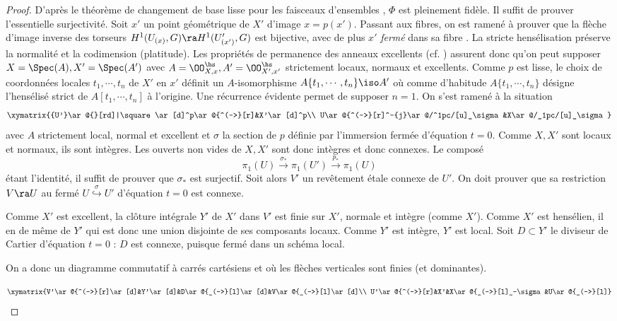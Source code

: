 \documentclass[10pt]{../fichiers-configuration-latex/smfart}
\begin{document}
\begin{proof} D'après le théorème de changement de base lisse  pour les faisceaux d'ensembles
, $\Phi$ est pleinement fidèle. Il suffit de prouver l'essentielle surjectivité.
Soit $x'$ un point géométrique de $X'$ d'image $x=p(x')$. Passant aux fibres, on est ramené à
prouver que la flèche d'image inverse des torseurs $H^1(U_{(x)},G)\ra H^1(U'_{(x')},G)$ est
bijective, avec de plus $x'$ \emph{fermé} dans sa fibre . La stricte
hensélisation préserve la normalité et la codimension (platitude).  Les propriétés de permanence des
anneaux excellents (cf. )
assurent donc qu'on peut supposer $X=\Spec(A), X'=\Spec(A')$
avec $A=\OO_{X,x}^\hs, A'=\OO_{X',x'}^\hs$ strictement locaux, normaux et excellents. Comme $p$ est
lisse, le choix de coordonnées locales $t_1,\cdots,t_n$ de $X'$ en $x'$ définit un $A$-isomorphisme
$A\{t_1,\cdots,t_n\}\iso A'$ où comme d'habitude $A\{t_1,\cdots,t_n\}$ désigne l'hensélisé strict de
$A[t_1,\cdots,t_n]$ à l'origine. Une récurrence évidente permet de supposer $n=1$. On s'est ramené à
la situation $$\xymatrix{{U'}\ar@{}[rd]|\square\ar[d]^p\ar@{^(->}[r]&X'\ar[d]^p\\
U\ar@{^(->}[r]^-{j}\ar@/^1pc/[u]_\sigma&X\ar@/_1pc/[u]_\sigma}$$ avec $A$ strictement local, normal
et excellent et $\sigma$ la section de $p$ définie par l'immersion fermée d'équation $t=0$. Comme
$X,X'$ sont locaux et normaux, ils sont intègres. Les ouverts non vides de $X,X'$ sont donc intègres
et donc connexes. Le composé $$\pi_1(U)\xrightarrow{\sigma_*}\pi_1({U'})\xrightarrow{p_*}\pi_1(U)$$
étant l'identité, il suffit de prouver que $\sigma_*$ est surjectif. Soit alors ${V'}$ un revêtement
étale connexe de ${U'}$. On doit prouver que sa restriction $V\ra U$ au fermé
$U\stackrel{\sigma}{\hookrightarrow} U'$ d'équation $t=0$ est connexe.

Comme ${X'}$ est excellent, la clôture intégrale ${Y'}$ de ${X'}$ dans ${V'}$  est finie sur ${X'}$,
normale et intègre (comme $X'$). Comme $X'$ est hensélien, il en de même de $Y'$ qui est donc une
union disjointe de ses composants locaux. Comme $Y'$ est intègre, $Y'$ est local.  Soit $D\subset
{Y'}$ le diviseur de Cartier d'équation $t=0$ :  $D$ est connexe, puisque fermé dans un schéma
local.


On a donc un diagramme commutatif à carrés cartésiens et où les flèches verticales sont finies (et
dominantes).

$$\xymatrix{V'\ar@{^(->}[r]\ar[d]&Y'\ar[d]&D\ar@{_(->}[l]\ar[d]&V\ar@{_(->}[l]\ar[d]\\
U'\ar@{^(->}[r]&X'&X\ar@{_(->}[l]_-\sigma&U\ar@{_(->}[l]}$$


\end{proof}
\end{document}
